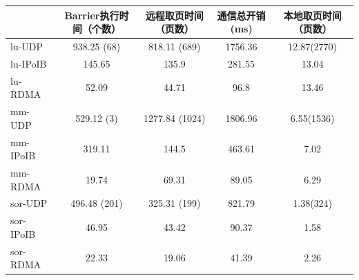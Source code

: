 {    \begin{table}[!htbp]
        \footnotesize%
        \setlength{\tabcolsep}{4pt}%
        \renewcommand{\arraystretch}{1.5}%
        \centering
        \label{tab:type2-time}
        \begin{tabular}{l|c|c|c|c}
            \hline
                      & Barrier执行时间（个数） & 远程取页时间（页数）     & 通信总开销(ms) & 本地取页时间（页数）  \\
            \hline
            lu-UDP    & 938.25 (68)     & 818.11 (689)   & 1756.36   & 12.87(2770) \\
            lu-IPoIB  & 145.65          & 135.9          & 281.55    & 13.04       \\
            lu-RDMA   & 52.09           & 44.71          & 96.8      & 13.46       \\
            \hline
            mm-UDP    & 529.12 (3)      & 1277.84 (1024) & 1806.96   & 6.55(1536)  \\
            mm-IPoIB  & 319.11          & 144.5          & 463.61    & 7.02        \\
            mm-RDMA   & 19.74           & 69.31          & 89.05     & 6.29        \\
            \hline
            sor-UDP   & 496.48 (201)    & 325.31 (199)   & 821.79    & 1.38(324)   \\
            sor-IPoIB & 46.95           & 43.42          & 90.37     & 1.58        \\
            sor-RDMA  & 22.33           & 19.06          & 41.39     & 2.26        \\
            \hline
        \end{tabular}
    \end{table}

}
